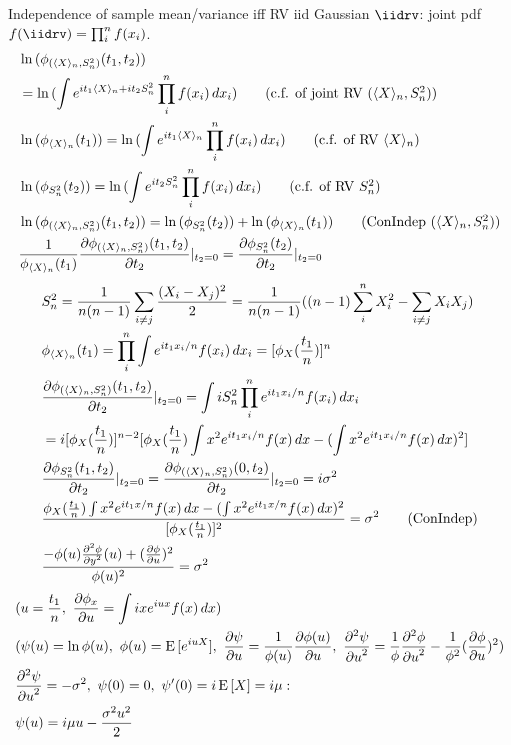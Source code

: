 \documentclass[asd-beamer.tex]{subfiles}%
\begin{document}
\begin{frame}{Independence of sample mean/variance iff RV iid Gaussian}
	$\iidrv$: joint pdf $f(\iidrv)=\prod_i^nf(x_i)$.
	\begin{align*}
	&\ln{(\phi_{(\exv{X}_n,S_n^2)}(t_1,t_2))}\\
	&=\ln{(\int\exp{it_1\exv{X}_n+it_2S_n^2}\prod_i^nf(x_i)\,dx_i)}\tag{c.f. of joint RV $(\exv{X}_n,S_n^2)$}\\
	&\ln{(\phi_{\exv{X}_n}(t_1))}=\ln{(\int\exp{it_1\exv{X}_n}\prod_i^nf(x_i)\,dx_i)}\tag{c.f. of RV $\exv{X}_n$}\\
	&\ln{(\phi_{S_n^2}(t_2))}=\ln{(\int\exp{it_2S_n^2}\prod_i^nf(x_i)\,dx_i)}\tag{c.f. of RV $S_n^2$}\\
	&\ln{(\phi_{(\exv{X}_n,S_n^2)}(t_1,t_2))}=\ln{(\phi_{S_n^2}(t_2))}+\ln{(\phi_{\exv{X}_n}(t_1))}\tag{ConIndep ($\exv{X}_n, S_n^2$)}\\
	&\frac{1}{\phi_{\exv{X}_n}(t_1)}\PDy{t_2}{\phi_{(\exv{X}_n,S_n^2)}(t_1,t_2)}|_{t_2=0}=\PDy{t_2}{\phi_{S_n^2}(t_2)}|_{t_2=0}
	\end{align*}
	\begin{align*}
	&S_n^2=\frac{1}{n(n-1)}\sum_{i\neq j}\frac{(X_i-X_j)^2}{2}=\frac{1}{n(n-1)}((n-1)\sum_i^nX_i^2-\sum_{i\neq j}X_iX_j)\\
	&\phi_{\exv{X}_n}(t_1)=\prod_i^n\int\exp{it_1x_i/n}f(x_i)\,dx_i=[\phi_X(\frac{t_1}{n})]^n\\
	&\PDy{t_2}{\phi_{(\exv{X}_n,S_n^2)}(t_1,t_2)}|_{t_2=0}=\int iS_n^2\prod_i^n\exp{it_1x_i/n}f(x_i)\,dx_i\\
	&=i[\phi_X(\frac{t_1}{n})]^{n-2}[\phi_X(\frac{t_1}{n})\int x^2\exp{it_1x_i/n}f(x)\,dx-(\int x^2\exp{it_1x_i/n}f(x)\,dx)^2]\\
	&\PDy{t_2}{\phi_{S_n^2}(t_1,t_2)}|_{t_2=0}=\PDy{t_2}{\phi_{(\exv{X}_n,S_n^2)}(0,t_2)}|_{t_2=0}=i\sigma^2\\
	&\frac{\phi_X(\frac{t_1}{n})\int x^2\exp{it_1x/n}f(x)\,dx-(\int x^2\exp{it_1x/n}f(x)\,dx)^2}{[\phi_X(\frac{t_1}{n})]^2}=\sigma^2\tag{ConIndep}\\
	&\frac{-\phi(u)\PtwoDy{y}{\phi}(u)+(\PDy{u}{\phi})^2}{\phi(u)^2}=\sigma^2
	\end{align*}
	\begin{align*}
	&(u=\frac{t_1}{n},\ \PDy{u}{\phi_x}=\int ix\exp{iux}f(x)\,dx)\\
	&(\psi(u)=\ln{\phi(u)},\ \phi(u)=\E{[\exp{iuX}]},\ \PDy{u}{\psi}=\frac{1}{\phi(u)}\PDy{u}{\phi(u)},\ \PtwoDy{u}{\psi}=\frac{1}{\phi}\PtwoDy{u}{\phi}-\frac{1}{\phi^2}(\PDy{u}{\phi})^2)\\
	&\PtwoDy{u}{\psi}=-\sigma^2,\ \psi(0)=0,\ \psi'(0)=i\E{[X]}=i\mu:\\
	&\psi(u)=i\mu u-\frac{\sigma^2u^2}{2}
	\end{align*}
\end{frame}
\end{document}
